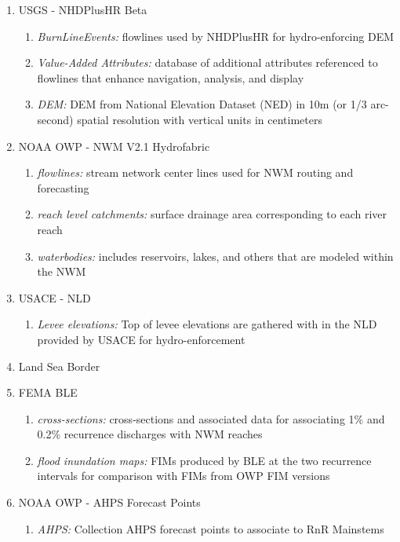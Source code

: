 \begin{enumerate}
\item{USGS - NHDPlusHR Beta}
    \begin{enumerate}
    \item{\textit{BurnLineEvents:} flowlines used by NHDPlusHR for hydro-enforcing DEM}
    \item{\textit{Value-Added Attributes:} database of additional attributes referenced to flowlines that enhance navigation, analysis, and display}
    \item{\textit{DEM:} DEM from National Elevation Dataset (NED) in 10m (or 1/3 arc-second) spatial resolution with vertical units in centimeters \cite{gesch2002national}}
    \end{enumerate}
\item{NOAA OWP - NWM V2.1 Hydrofabric}
    \begin{enumerate}
    \item{\textit{flowlines:} stream network center lines used for NWM routing and forecasting}
    \item{\textit{reach level catchments:} surface drainage area corresponding to each river reach}
    \item{\textit{waterbodies:} includes reservoirs, lakes, and others that are modeled within the NWM}
    \end{enumerate}
\item{USACE - NLD}
    \begin{enumerate}
    \item{\textit{Levee elevations:} Top of levee elevations are gathered with in the NLD provided by USACE for hydro-enforcement}
    \end{enumerate}
\item{Land Sea Border}
\item{FEMA BLE}
    \begin{enumerate}
    \item{\textit{cross-sections:} cross-sections and associated data for associating 1\% and 0.2\% recurrence discharges with NWM reaches}
    \item{\textit{flood inundation maps:} FIMs produced by BLE at the two recurrence intervals for comparison with FIMs from OWP FIM versions}
    \end{enumerate}
\item{NOAA OWP - AHPS Forecast Points}
    \begin{enumerate}
    \item{\textit{AHPS:} Collection AHPS forecast points to associate to RnR Mainstems}
    \end{enumerate}
\end{enumerate}
%

